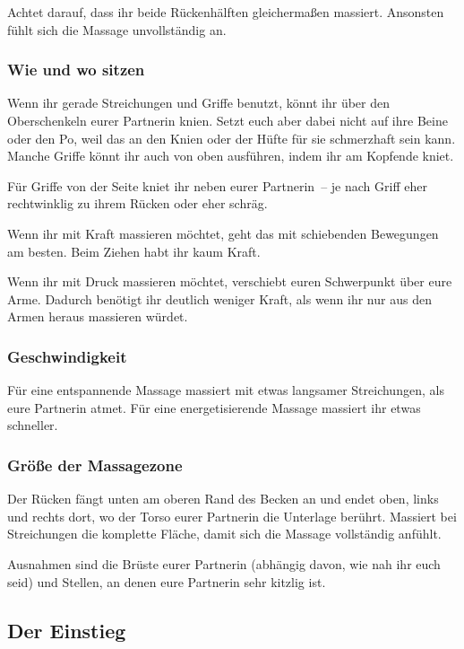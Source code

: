 Achtet darauf, dass ihr beide Rückenhälften gleichermaßen massiert. Ansonsten fühlt sich die Massage unvollständig an.

\subsubsection{Wie und wo sitzen}

Wenn ihr gerade Streichungen und Griffe benutzt, könnt ihr über den Oberschenkeln eurer Partnerin knien. Setzt euch aber dabei nicht auf ihre Beine oder den Po, weil das an den Knien oder der Hüfte für sie schmerzhaft sein kann. Manche Griffe könnt ihr auch von oben ausführen, indem ihr am Kopfende kniet.

Für Griffe von der Seite kniet ihr neben eurer Partnerin~-- je nach Griff eher rechtwinklig zu ihrem Rücken oder eher schräg.

Wenn ihr mit Kraft massieren möchtet, geht das mit schiebenden Bewegungen am besten. Beim Ziehen habt ihr kaum Kraft.

Wenn ihr mit Druck massieren möchtet, verschiebt euren Schwerpunkt über eure Arme. Dadurch benötigt ihr deutlich weniger Kraft, als wenn ihr nur aus den Armen heraus massieren würdet.


\subsubsection{Geschwindigkeit}
Für eine entspannende Massage massiert mit etwas langsamer Streichungen, als eure Partnerin atmet. Für eine energetisierende Massage massiert ihr etwas schneller.


\subsubsection{Größe der Massagezone}

Der Rücken fängt unten am oberen Rand des Becken an und endet oben, links und rechts dort, wo der Torso eurer Partnerin die Unterlage berührt. Massiert bei Streichungen die komplette Fläche, damit sich die Massage vollständig anfühlt.

Ausnahmen sind die Brüste eurer Partnerin (abhängig davon, wie nah ihr euch seid) und Stellen, an denen eure Partnerin sehr kitzlig ist.


\subsection{Der Einstieg}

